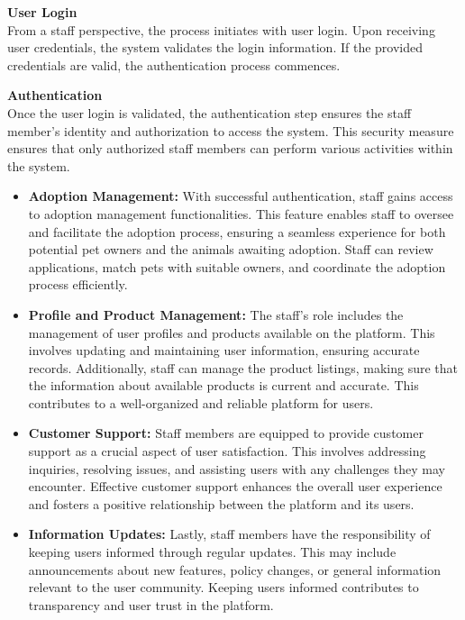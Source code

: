     \noindent\textbf{User Login}\\
        From a staff perspective, the process initiates with user login. Upon receiving user credentials, the system validates the login information. If the provided credentials are valid, the authentication process commences.

        \noindent \textbf{Authentication}\\
        Once the user login is validated, the authentication step ensures the staff member's identity and authorization to access the system. This security measure ensures that only authorized staff members can perform various activities within the system.
  \begin{itemize}
  \item \textbf{Adoption Management:}
        With successful authentication, staff gains access to adoption management functionalities. This feature enables staff to oversee and facilitate the adoption process, ensuring a seamless experience for both potential pet owners and the animals awaiting adoption. Staff can review applications, match pets with suitable owners, and coordinate the adoption process efficiently.

  \item \textbf{Profile and Product Management:}
        The staff's role includes the management of user profiles and products available on the platform. This involves updating and maintaining user information, ensuring accurate records. Additionally, staff can manage the product listings, making sure that the information about available products is current and accurate. This contributes to a well-organized and reliable platform for users.

  \item \textbf{Customer Support:}
        Staff members are equipped to provide customer support as a crucial aspect of user satisfaction. This involves addressing inquiries, resolving issues, and assisting users with any challenges they may encounter. Effective customer support enhances the overall user experience and fosters a positive relationship between the platform and its users.

  \item \textbf{Information Updates:}
        Lastly, staff members have the responsibility of keeping users informed through regular updates. This may include announcements about new features, policy changes, or general information relevant to the user community. Keeping users informed contributes to transparency and user trust in the platform.
\end{itemize}